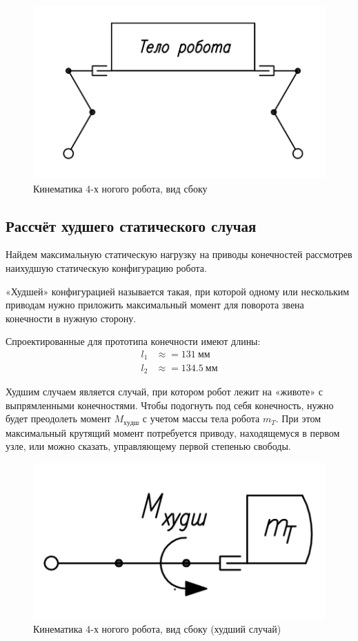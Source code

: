 \begin{figure}[ht]
    \centering
    \includegraphics[scale=0.7]{kin1.png}
    \caption{Кинематика 4-х ногого робота, вид сбоку}
    \label{fig:kin_scheme1}
\end{figure}


\subsection{Рассчёт худшего статического случая}

Найдем максимальную статическую нагрузку на приводы конечностей рассмотрев наихудшую статическую конфигурацию робота.

«Худшей» конфигурацией называется такая, при которой одному или нескольким приводам нужно приложить максимальный момент для поворота звена конечности в нужную сторону.

Спроектированные для прототипа конечности имеют длины:
\begin{align*}
    l_1 &\approx = 131\: мм \\
    l_2 &\approx = 134.5\: мм
\end{align*}

Худшим случаем является случай, при котором робот лежит на «животе» с выпрямленными конечностями. Чтобы подогнуть под себя конечность, нужно будет преодолеть момент $M_{худш}$ с учетом массы тела робота $m_T$. При этом максимальный крутящий момент потребуется приводу, находящемуся в первом узле, или можно сказать, управляющему первой степенью свободы.

\begin{figure}[ht]
    \centering
    \includegraphics[scale=1]{kin2.png}
    \caption{Кинематика 4-х ногого робота, вид сбоку (худший случай)}
\end{figure}

